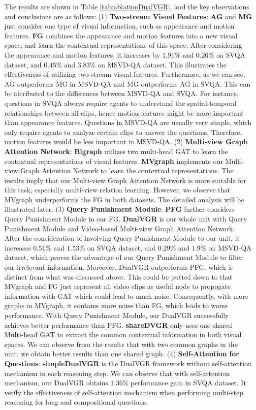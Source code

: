 \documentclass[journal]{IEEEtran}
\begin{document}
The results are shown in Table \ref{tab:ablationDualVGR}, and the key observations and conclusions are as follows: (1) \textbf{Two-stream Visual Features}: \textbf{AG} and \textbf{MG} just consider one type of visual information, such as appearance and motion features. \textbf{FG} combines the appearance and motion features into a new visual space, and learn the contextual representations of this space. After considering the appearance and motion features, it increases by $1.91\%$ and $0.26\%$ on SVQA dataset, and $0.45\%$ and $3.83\%$ on MSVD-QA dataset. This illustrates the effectiveness of utilizing two-stream visual features. Furthermore, as we can see, AG outperforms MG in MSVD-QA and MG outperforms AG in SVQA. This can be attributed to the differences between MSVD-QA and SVQA. For instance, questions in SVQA always require agents to understand the spatial-temporal relationships between all clips, hence motion features might be more important than appearance features. Questions in MSVD-QA are usually very simple, which only require agents to analyze certain clips to answer the questions. Therefore, motion features would be less important in MSVD-QA. (2) \textbf{Multi-view Graph Attention Network}: \textbf{Bigraph} utilizes two multi-head GAT to learn the contextual representations of visual features. \textbf{MVgraph} implements our Multi-view Graph Attention Network to learn the contextual representations. The results imply that our Multi-view Graph Attention Network is more suitable for this task, especially multi-view relation learning. However, we observe that MVgraph underperforms the FG in both datasets. The detailed analysis will be illustrated later. (3) \textbf{Query Punishment Module}: \textbf{PFG} further considers Query Punishment Module in our FG. \textbf{DualVGR} is our whole unit with Query Punishment Module and Video-based Multi-view Graph Attention Network. After the consideration of involving Query Punishment Module to our unit, it increases $0.51\%$ and $1.53\%$ on SVQA dataset, and $0.29\%$ and $1.9\%$ on MSVD-QA dataset, which proves the advantage of our Query Punishment Module to filter our irrelevant information. Moreover, DualVGR outperforms PFG, which is distinct from what was discussed above. This could be putted down to that MVgraph and FG just represent all video clips as useful node to propogate information with GAT which could lead to much noise. Consequently, with more graphs in MVgraph, it contains more noise than FG, which leads to worse performance. With Query Punishment Module, our DualVGR successfully achieves better performance than PFG. \textbf{shareDVGR} only uses one shared Multi-head GAT to extract the common contextual information in both visual spaces. We can observe from the results that with two common graphs in the unit, we obtain better results than one shared graph. (4) \textbf{Self-Attention for Questions}: \textbf{simpleDualVGR} is the DualVGR framework without self-attention mechanism in each reasoning step. We can observe that with self-attention mechanism, our DualVGR obtains $1.36\%$ performance gain in SVQA dataset. It verify the effectiveness of self-attention mechanism when performing multi-step reasoning for long and compositional questions.
\end{document}
